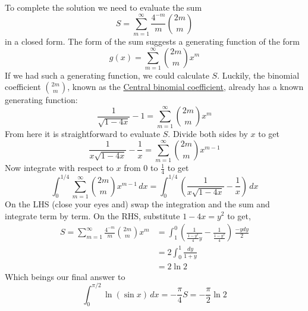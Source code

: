 \documentclass[11pt,oneside,reqno]{amsart}
\begin{document}
%
To complete the solution we need to evaluate the sum 
%
\begin{equation}
S = \sum_{m=1}^{\infty} \frac{4^{-m}}{m} {2m\choose m}
\end{equation} 
%
in a closed form. The form of the sum suggests a generating function of the form
\begin{equation*}
g(x) = \sum_{m=1}^{\infty}{2m\choose m} x^m
\end{equation*}
If we had such a generating function, we could calculate $S$. Luckily, the binomial coefficient ${2m \choose m}$, known as the \href{http://tinyurl.com/3tspr8wp}{Central binomial coefficient}, already has a known generating function:
%
\begin{equation*}
\frac{1}{\sqrt{1-4x}} - 1 = \sum_{m=1}^{\infty}{2m\choose m} x^m
\end{equation*}
%
From here it is straightforward to evaluate $S$. Divide both sides by $x$ to get 
\begin{equation*}
\frac{1}{x\sqrt{1-4x}} - \frac{1}{x} = \sum_{m=1}^{\infty}{2m\choose m} x^{m-1}
\end{equation*}
%
Now integrate with respect to $x$ from $0$ to $\frac{1}{4}$ to get
\begin{equation}
\int_0^{1/4}\sum_{m=1}^{\infty}{2m\choose m} x^{m-1}\,dx = \int_0^{1/4}\left(\frac{1}{x\sqrt{1-4x}} - \frac{1}{x}\right)\,dx 
\end{equation}
On the LHS (close your eyes and) swap the integration and the sum and integrate term by term. On the RHS, substitute $1-4x = y^2$ to get,
%
\begin{align*}
S = \sum_{m=1}^{\infty}\frac{4^{-m}}{m}{2m\choose m} x^m &= \int_1^0\left(\frac{1}{\frac{1-y^2}{4}y} - \frac{1}{\frac{1-y^2}{4}}\right)\,\frac{-ydy}{2} \\
&=2 \int_0^1\frac{dy}{1 + y}\\
&= 2\ln 2
\end{align*}
%
Which beings our final answer to
\begin{equation*}
\int_0^{\pi/2}\ln(\sin x)\, dx = -\frac{\pi}{4}S =-\frac{\pi}{2} \ln 2
\end{equation*}
\end{document}
